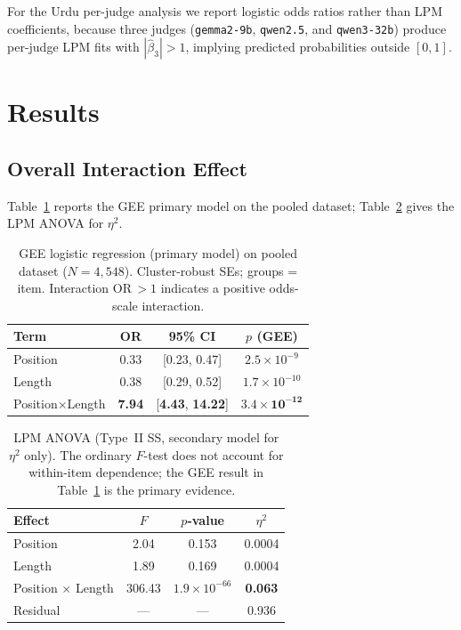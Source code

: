 \documentclass[10pt,conference]{IEEEtran}
\newcommand{\hb}{\hat{\beta}_3}
\begin{document}
For the Urdu per-judge analysis we report logistic odds ratios rather than LPM coefficients, because three judges (\texttt{gemma2-9b}, \texttt{qwen2.5}, and \texttt{qwen3-32b}) produce per-judge LPM fits with $|\hb|>1$, implying predicted probabilities outside $[0,1]$.

\section{Results}
\subsection{Overall Interaction Effect}
Table~\ref{tab:gee} reports the GEE primary model on the pooled dataset; Table~\ref{tab:anova} gives the LPM ANOVA for $\eta^2$.

\begin{table}[t]
\caption{GEE logistic regression (primary model) on pooled dataset ($N=4{,}548$). Cluster-robust SEs; groups = item. Interaction OR\,$>1$ indicates a positive odds-scale interaction.}
\label{tab:gee}
\centering
\footnotesize
\begin{tabular}{@{}lccc@{}}
\toprule
Term & OR & 95\% CI & $p$ (GEE) \\
\midrule
Position & 0.33 & [0.23, 0.47] & $2.5\times10^{-9}$ \\
Length & 0.38 & [0.29, 0.52] & $1.7\times10^{-10}$ \\
Position$\times$Length & \textbf{7.94} & [\textbf{4.43}, \textbf{14.22}] & $\mathbf{3.4\times10^{-12}}$ \\
\bottomrule
\end{tabular}
\end{table}

\begin{table}[t]
\caption{LPM ANOVA (Type~II SS, secondary model for $\eta^2$ only). The ordinary $F$-test does not account for within-item dependence; the GEE result in Table~\ref{tab:gee} is the primary evidence.}
\label{tab:anova}
\centering
\footnotesize
\begin{tabular}{@{}lccc@{}}
\toprule
Effect & $F$ & $p$-value & $\eta^2$ \\
\midrule
Position & 2.04 & 0.153 & 0.0004 \\
Length & 1.89 & 0.169 & 0.0004 \\
Position $\times$ Length & 306.43 & $1.9\times10^{-66}$ & \textbf{0.063} \\
Residual & --- & --- & 0.936 \\
\bottomrule
\end{tabular}
\end{table}
\end{document}
